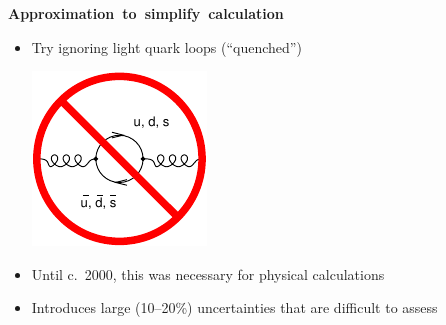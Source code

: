 \documentclass[landscape]{article}
\newenvironment{slide}[1][ ]{\mbox{\bf \boldmath #1 } \vfill}{\vfill \vspace{-1.5 cm} \mbox{ } \pagebreak}
\newenvironment{itemizer}[1]{\begin{itemize}\setlength{\itemsep}{#1}}{\end{itemize}}
\begin{document}
\begin{slide}[Approximation to simplify calculation]

\begin{itemizer}{2 cm}

  \item \begin{minipage}{0.6\linewidth} Try ignoring light quark loops (``quenched'') \end{minipage} \hfill \begin{minipage}{7 cm} \includegraphics[width=\linewidth]{quenched} \end{minipage}

  \item Until c.\ 2000, this was necessary for physical calculations

  \item Introduces large (10--20\%) uncertainties that are difficult to assess

\end{itemizer}

\end{slide}
\end{document}
